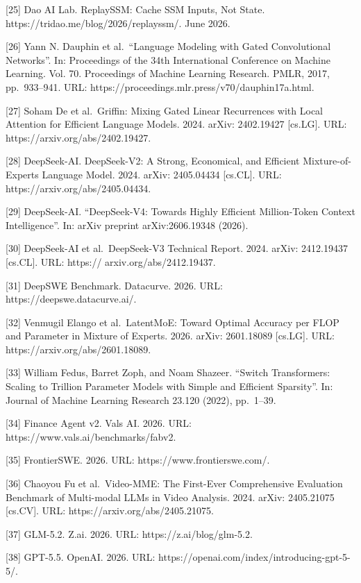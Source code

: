\documentclass[
  10
]{article}
\begin{document}
{[}25{]} Dao AI Lab. ReplaySSM: Cache SSM Inputs, Not State.
https://tridao.me/blog/2026/replayssm/. June 2026.

{[}26{]} Yann N. Dauphin et al.~``Language Modeling with Gated
Convolutional Networks''. In: Proceedings of the 34th International
Conference on Machine Learning. Vol. 70. Proceedings of Machine Learning
Research. PMLR, 2017, pp.~933--941. URL:
https://proceedings.mlr.press/v70/dauphin17a.html.

{[}27{]} Soham De et al.~Griffin: Mixing Gated Linear Recurrences with
Local Attention for Efficient Language Models. 2024. arXiv: 2402.19427
{[}cs.LG{]}. URL: https://arxiv.org/abs/2402.19427.

{[}28{]} DeepSeek-AI. DeepSeek-V2: A Strong, Economical, and Efficient
Mixture-of-Experts Language Model. 2024. arXiv: 2405.04434 {[}cs.CL{]}.
URL: https://arxiv.org/abs/2405.04434.

{[}29{]} DeepSeek-AI. ``DeepSeek-V4: Towards Highly Efficient
Million-Token Context Intelligence''. In: arXiv preprint
arXiv:2606.19348 (2026).

{[}30{]} DeepSeek-AI et al.~DeepSeek-V3 Technical Report. 2024. arXiv:
2412.19437 {[}cs.CL{]}. URL: https:// arxiv.org/abs/2412.19437.

{[}31{]} DeepSWE Benchmark. Datacurve. 2026. URL:
https://deepswe.datacurve.ai/.

{[}32{]} Venmugil Elango et al.~LatentMoE: Toward Optimal Accuracy per
FLOP and Parameter in Mixture of Experts. 2026. arXiv: 2601.18089
{[}cs.LG{]}. URL: https://arxiv.org/abs/2601.18089.

{[}33{]} William Fedus, Barret Zoph, and Noam Shazeer. ``Switch
Transformers: Scaling to Trillion Parameter Models with Simple and
Efficient Sparsity''. In: Journal of Machine Learning Research 23.120
(2022), pp.~1--39.

{[}34{]} Finance Agent v2. Vals AI. 2026. URL:
https://www.vals.ai/benchmarks/fabv2.

{[}35{]} FrontierSWE. 2026. URL: https://www.frontierswe.com/.

{[}36{]} Chaoyou Fu et al.~Video-MME: The First-Ever Comprehensive
Evaluation Benchmark of Multi-modal LLMs in Video Analysis. 2024. arXiv:
2405.21075 {[}cs.CV{]}. URL: https://arxiv.org/abs/2405.21075.

{[}37{]} GLM-5.2. Z.ai. 2026. URL: https://z.ai/blog/glm-5.2.

{[}38{]} GPT-5.5. OpenAI. 2026. URL:
https://openai.com/index/introducing-gpt-5-5/.
\end{document}
